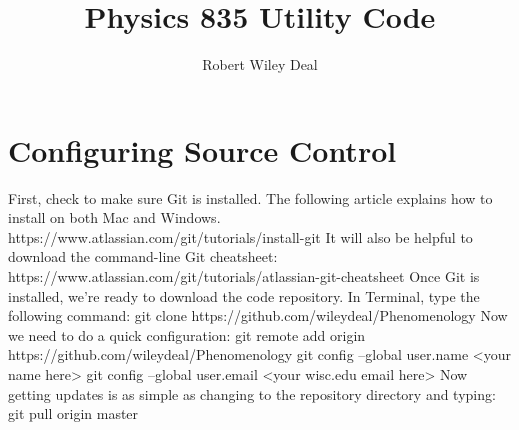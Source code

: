 \documentclass[11pt]{article} %
\title{Physics 835 Utility Code}
\author{Robert Wiley Deal}
\begin{document}
\maketitle

\section{Configuring Source Control}

First, check to make sure Git is installed. The following article explains how to install on both Mac and Windows.
\newline
https://www.atlassian.com/git/tutorials/install-git
\newline
\newline
It will also be helpful to download the command-line Git cheatsheet:
\newline
https://www.atlassian.com/git/tutorials/atlassian-git-cheatsheet
\newline
\newline
Once Git is installed, we're ready to download the code repository. In Terminal, type the following command:
\newline
git clone https://github.com/wileydeal/Phenomenology
\newline
\newline
Now we need to do a quick configuration:
\newline
git remote add origin https://github.com/wileydeal/Phenomenology
\newline
git config --global user.name \textless your name here\textgreater
\newline
git config --global user.email \textless your wisc.edu email here\textgreater
\newline
\newline
Now getting updates is as simple as changing to the repository directory and typing: 
\newline
git pull origin master
\end{document}
